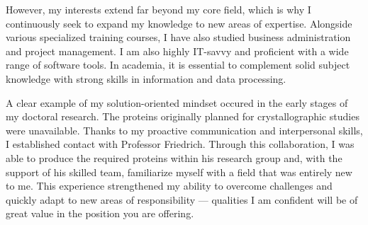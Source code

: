     However, my interests extend far beyond my core field, which is why I continuously seek to expand my knowledge to new areas of expertise. Alongside various specialized training courses, I have also studied business administration and project management. I am also highly IT-savvy and proficient with a wide range of software tools. In academia, it is essential to complement solid subject knowledge with strong skills in information and data processing. 
    \par 

A clear example of my solution-oriented mindset occured in the early stages of my doctoral research. The proteins originally planned for crystallographic studies were unavailable. Thanks to my proactive communication and interpersonal skills, I established contact with Professor Friedrich. Through this collaboration, I was able to produce the required proteins within his research group and, with the support of his skilled team, familiarize myself with a field that was entirely new to me. This experience strengthened my ability to overcome challenges and quickly adapt to new areas of responsibility --- qualities I am confident will be of great value in the position you are offering.\par 

